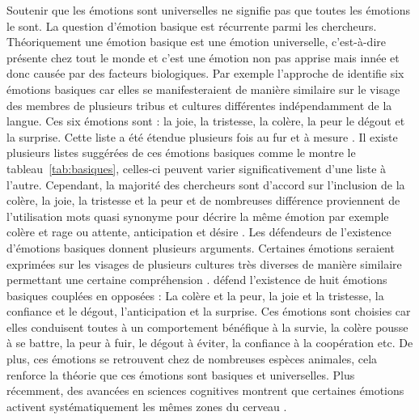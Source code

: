 \documentclass[a4paper,12pt]{report}
\begin{document}
Soutenir que les émotions sont universelles ne signifie pas que toutes les émotions le sont. 
La question d'émotion basique est récurrente parmi les chercheurs. Théoriquement une émotion basique est une émotion universelle, c'est-à-dire présente chez tout le monde et c'est une émotion non pas apprise mais innée et donc causée par des facteurs biologiques. Par exemple l'approche de \textcite{ekman71} identifie six émotions basiques car elles se manifesteraient de manière similaire sur le visage des membres de plusieurs tribus et cultures différentes indépendamment de la langue. Ces six émotions sont : la joie, la tristesse, la colère, la peur le dégout et la surprise. Cette liste a été étendue plusieurs fois au fur et à mesure \parencites{ekman92a, ekman99}. Il existe plusieurs listes suggérées de ces émotions basiques comme le montre le tableau~\ref{tab:basiques}, celles-ci peuvent varier significativement d'une liste à l'autre. Cependant, la majorité des chercheurs sont d'accord sur l'inclusion de la colère, la joie, la tristesse et la peur et de nombreuses différence proviennent de l'utilisation mots quasi synonyme pour décrire la même émotion par exemple colère et rage ou attente, anticipation et désire \parencite{ortony90}.  Les défendeurs de l'existence d'émotions basiques donnent plusieurs arguments. Certaines émotions seraient exprimées sur les visages de plusieurs cultures très diverses de manière similaire permettant une certaine compréhension \parencite{ekman92b}. \textcite{plutchik62} défend l'existence de huit émotions basiques couplées en opposées : La colère et la peur, la joie et la tristesse, la confiance et le dégout, l'anticipation et la surprise. Ces émotions sont choisies car elles conduisent toutes à un comportement bénéfique à la survie, la colère pousse à se battre, la peur à fuir, le dégout à éviter, la confiance à la coopération etc. De plus, ces émotions se retrouvent chez de nombreuses espèces animales, cela renforce la théorie que ces émotions sont basiques et universelles. Plus récemment, des avancées en sciences cognitives montrent que certaines émotions activent systématiquement les mêmes zones du cerveau \parencite{celeghin17}. \par  
\end{document}
